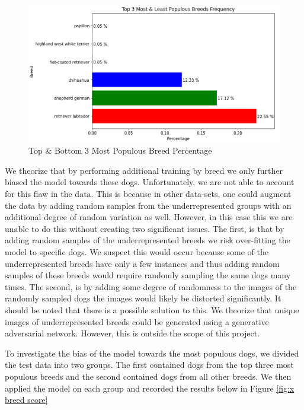 \documentclass{article}
\begin{document}
\begin{figure}[]
\centering
	\includegraphics[scale=0.7]{final-report-images/breed_distr.png}
\caption{Top \& Bottom 3 Most Populous Breed Percentage}
\label{fig:x breed distr}
\end{figure}

\newpage

We theorize that by performing additional training by breed we only further biased the model towards these dogs.  Unfortunately, we are not able to account for this flaw in the data.  This is because in other data-sets, one could augment the data by adding random samples from the underrepresented groups with an additional degree of random variation as well.  However, in this case this we are unable to do this without creating two significant issues.  The first, is that by adding random samples of the underrepresented breeds we risk over-fitting the model to specific dogs.  We suspect this would occur because some of the underrepresented breeds have only a few instances and thus adding random samples of these breeds would require randomly sampling the same dogs many times.  The second, is by adding some degree of randomness to the images of the randomly sampled dogs the images would likely be distorted significantly.  It should be noted that there is a possible solution to this.  We theorize that unique images of underrepresented breeds could be generated using a generative adversarial network.  However, this is outside the scope of this project.

To investigate the bias of the model towards the most populous dogs, we divided the test data into two groups.  The first contained dogs from the top three most populous breeds and the second contained dogs from all other breeds.  We then applied the model on each group and recorded the results below in Figure \ref{fig:x breed score}
\end{document}
